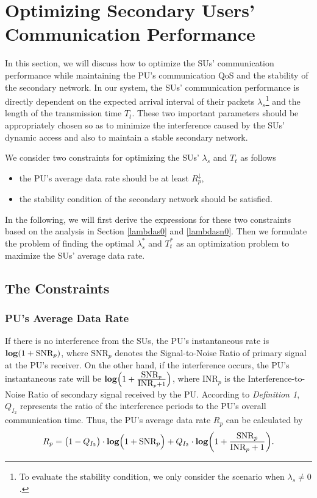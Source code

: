 \documentclass[11pt,draftcls]{IEEEtran}{\onecolumn}
\begin{document}
\section{Optimizing Secondary Users' Communication Performance}\label{control}

In this section, we will discuss how to optimize the SUs'
communication performance while maintaining the PU's communication
QoS and the stability of the secondary network. In our
system, the SUs' communication performance is directly dependent on
the expected arrival interval of their packets
$\lambda_s$\footnote{To evaluate the stability condition, we only
consider the scenario when $\lambda_s \neq 0$.} and the length of
the transmission time $T_t$. These two important parameters should
be appropriately chosen so as to minimize the interference caused by
the SUs' dynamic access and also to maintain a stable secondary
network.

We consider two constraints for optimizing the SUs' $\lambda_s$ and
$T_t$ as follows
\begin{itemize}
\item the PU's average data rate should be at least $R_p^{\downarrow}$,
\item the stability condition of the secondary network should be satisfied.
\end{itemize}
In the following, we will first derive the expressions for these two
constraints based on the analysis in Section \ref{lambdas0} and
\ref{lambdasn0}. Then we formulate the problem of finding the
optimal $\lambda_s^\ast$ and $T_t^\ast$ as an optimization problem
to maximize the SUs' average data rate.

\subsection{The Constraints}

\subsubsection{PU's Average Data Rate}
If there is no interference from the SUs, the PU's instantaneous
rate is $\mbox{\textbf{log}}(1+\mbox{SNR}_p)$, where $\mbox{SNR}_p$
denotes the Signal-to-Noise Ratio of primary signal at the PU's
receiver. On the other hand, if the interference occurs, the PU's
instantaneous rate will be
$\mbox{\textbf{log}}\Big(1+\frac{\mbox{SNR}_p}{\mbox{INR}_p+1}\Big)$,
where $\mbox{INR}_p$ is the Interference-to-Noise Ratio of secondary
signal received by the PU. According to \emph{Definition 1},
$Q_{I_2}$ represents the ratio of the interference periods to the
PU's overall communication time. Thus, the PU's average data rate
$R_{p}$ can be calculated by
\begin{equation}
R_{p}=\big(1-Q_{I_2}\big)\cdot\mbox{\textbf{log}}\Big(1+\mbox{SNR}_p\Big)+Q_{I_2}\cdot
\mbox{\textbf{log}}\bigg(1+\frac{\mbox{SNR}_p}
{\mbox{INR}_p+1}\bigg).\label{rp}
\end{equation}
\end{document}
